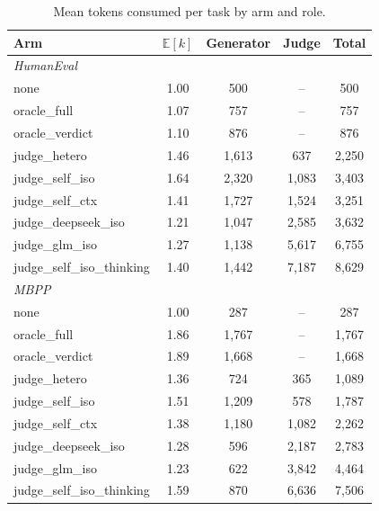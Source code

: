 \documentclass[10pt]{article}
\begin{document}
\begin{table}[htbp]
\centering\small
\caption{Mean tokens consumed per task by arm and role.}
\label{tab:cost}
\begin{tabular}{lcccc}
\toprule
Arm & $\mathbb{E}[k]$ & Generator & Judge & Total\\
\midrule
\multicolumn{5}{l}{\emph{HumanEval}}\\
none & 1.00 & 500 & -- & 500\\
oracle\_full & 1.07 & 757 & -- & 757\\
oracle\_verdict & 1.10 & 876 & -- & 876\\
judge\_hetero & 1.46 & 1{,}613 & 637 & 2{,}250\\
judge\_self\_iso & 1.64 & 2{,}320 & 1{,}083 & 3{,}403\\
judge\_self\_ctx & 1.41 & 1{,}727 & 1{,}524 & 3{,}251\\
judge\_deepseek\_iso & 1.21 & 1{,}047 & 2{,}585 & 3{,}632\\
judge\_glm\_iso & 1.27 & 1{,}138 & 5{,}617 & 6{,}755\\
judge\_self\_iso\_thinking & 1.40 & 1{,}442 & 7{,}187 & 8{,}629\\
\midrule
\multicolumn{5}{l}{\emph{MBPP}}\\
none & 1.00 & 287 & -- & 287\\
oracle\_full & 1.86 & 1{,}767 & -- & 1{,}767\\
oracle\_verdict & 1.89 & 1{,}668 & -- & 1{,}668\\
judge\_hetero & 1.36 & 724 & 365 & 1{,}089\\
judge\_self\_iso & 1.51 & 1{,}209 & 578 & 1{,}787\\
judge\_self\_ctx & 1.38 & 1{,}180 & 1{,}082 & 2{,}262\\
judge\_deepseek\_iso & 1.28 & 596 & 2{,}187 & 2{,}783\\
judge\_glm\_iso & 1.23 & 622 & 3{,}842 & 4{,}464\\
judge\_self\_iso\_thinking & 1.59 & 870 & 6{,}636 & 7{,}506\\
\bottomrule
\end{tabular}
\end{table}
\end{document}
